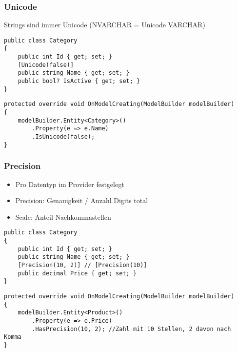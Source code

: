 \begin{multicols*}{2}
\subsubsection{Unicode}
Strings sind immer Unicode (NVARCHAR = Unicode VARCHAR)
\begin{lstlisting}
public class Category
{
    public int Id { get; set; } 
    [Unicode(false)]
    public string Name { get; set; } 
    public bool? IsActive { get; set; }
}
\end{lstlisting}
\begin{lstlisting}
protected override void OnModelCreating(ModelBuilder modelBuilder)
{
    modelBuilder.Entity<Category>()
        .Property(e => e.Name)
        .IsUnicode(false);
}
\end{lstlisting}
\subsubsection{Precision}
\begin{itemize}
    \item Pro Datentyp im Provider festgelegt
    \item Precision: Genauigkeit / Anzahl Digits total
    \item Scale: Anteil Nachkommastellen
\end{itemize}
\begin{lstlisting}
public class Category
{
    public int Id { get; set; }
    public string Name { get; set; } 
    [Precision(10, 2)] // [Precision(10)] 
    public decimal Price { get; set; }
}
\end{lstlisting}
\begin{lstlisting}
protected override void OnModelCreating(ModelBuilder modelBuilder)
{
    modelBuilder.Entity<Product>()
        .Property(e => e.Price)
        .HasPrecision(10, 2); //Zahl mit 10 Stellen, 2 davon nach Komma
}
\end{lstlisting}

\end{multicols*}
